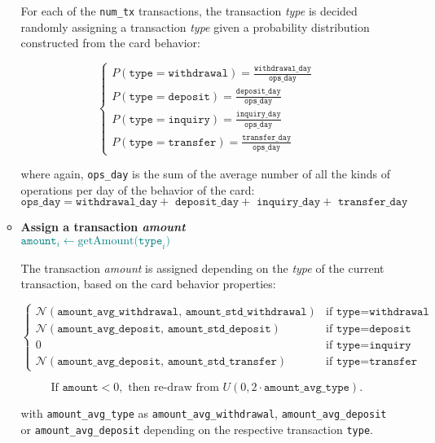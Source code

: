 \begin{enumerate}
\begin{itemize}
        For each of the \texttt{num\_tx} transactions, the transaction \emph{type} is decided randomly assigning a transaction \emph{type} given a probability distribution constructed from the card behavior:
        
        $$
        \begin{cases}
          P(\texttt{type} =  \texttt{withdrawal}) = \frac{\texttt{withdrawal\_day}}{\texttt{ops\_day}} \\[8pt]
          P(\texttt{type} =  \texttt{deposit}) = \frac{\texttt{deposit\_day}}{\texttt{ops\_day}} \\[8pt]
          P(\texttt{type} = \texttt{inquiry}) = \frac{\texttt{inquiry\_day}}{\texttt{ops\_day}} \\[8pt]
          P(\texttt{type} =  \texttt{transfer}) = \frac{\texttt{transfer\_day}}{\texttt{ops\_day}} 
        \end{cases}
        $$

        where again, \texttt{ops\_day} is the sum of the average number of all the kinds of operations per day of the behavior of the card: 
        $$\texttt{ops\_day} = \texttt{withdrawal\_day} + \texttt{ deposit\_day} + \texttt{ inquiry\_day} + \texttt{ transfer\_day}$$

        \item \textbf{Assign a transaction \emph{amount}}\\
        {\footnotesize \textcolor{teal}{$\texttt{amount}_{i} \gets  \text{getAmount(}\texttt{type}_{i}\text{)}$}}
          
        The transaction \emph{amount} is assigned depending on the \emph{type} of the current transaction, based on the card behavior properties:
            
          $$
          \begin{cases}
            \mathcal{N}(\texttt{amount\_avg\_withdrawal},\, \texttt{amount\_std\_withdrawal}) & \text{if } \texttt{type} = \texttt{withdrawal} \\[10pt]
            
            \mathcal{N}(\texttt{amount\_avg\_deposit},\, \texttt{amount\_std\_deposit}) & \text{if } \texttt{type} = \texttt{deposit} \\[10pt]
        
            0 & \text{if } \texttt{type} = \texttt{inquiry} \\[10pt]
            
            \mathcal{N}(\texttt{amount\_avg\_deposit},\, \texttt{amount\_std\_transfer}) & \text{if } \texttt{type} = \texttt{transfer}
          \end{cases}
          $$
        
          $$
          \text{If } \texttt{amount} < 0, \text{ then re-draw from } U(0, 2 \cdot \texttt{amount\_avg\_type}).
          $$
        
          with \texttt{amount\_avg\_type} as \texttt{amount\_avg\_withdrawal}, \texttt{amount\_avg\_deposit} or \texttt{amount\_avg\_deposit} depending on the respective transaction \texttt{type}.   
    \end{itemize}
\end{enumerate}

